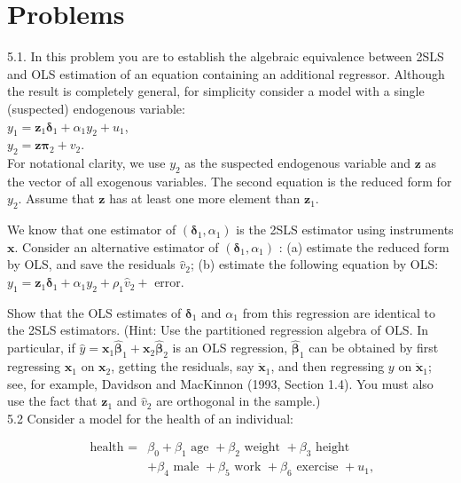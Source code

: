 \documentclass[10pt]{article}
\begin{document}
\section*{Problems}
5.1. In this problem you are to establish the algebraic equivalence between 2SLS and OLS estimation of an equation containing an additional regressor. Although the result is completely general, for simplicity consider a model with a single (suspected) endogenous variable:\\
$y_{1}=\mathbf{z}_{1} \boldsymbol{\delta}_{1}+\alpha_{1} y_{2}+u_{1}$,\\
$y_{2}=\mathbf{z} \boldsymbol{\pi}_{2}+v_{2}$.\\
For notational clarity, we use $y_{2}$ as the suspected endogenous variable and $\mathbf{z}$ as the vector of all exogenous variables. The second equation is the reduced form for $y_{2}$. Assume that $\mathbf{z}$ has at least one more element than $\mathbf{z}_{1}$.

We know that one estimator of $\left(\boldsymbol{\delta}_{1}, \alpha_{1}\right)$ is the 2SLS estimator using instruments $\mathbf{x}$. Consider an alternative estimator of $\left(\boldsymbol{\delta}_{1}, \alpha_{1}\right)$ : (a) estimate the reduced form by OLS, and save the residuals $\hat{v}_{2}$; (b) estimate the following equation by OLS:\\
$y_{1}=\mathbf{z}_{1} \boldsymbol{\delta}_{1}+\alpha_{1} y_{2}+\rho_{1} \hat{v}_{2}+$ error.

Show that the OLS estimates of $\boldsymbol{\delta}_{1}$ and $\alpha_{1}$ from this regression are identical to the 2SLS estimators. (Hint: Use the partitioned regression algebra of OLS. In particular, if $\hat{y}=\mathbf{x}_{1} \hat{\boldsymbol{\beta}}_{1}+\mathbf{x}_{2} \hat{\boldsymbol{\beta}}_{2}$ is an OLS regression, $\hat{\boldsymbol{\beta}}_{1}$ can be obtained by first regressing $\mathbf{x}_{1}$ on $\mathbf{x}_{2}$, getting the residuals, say $\ddot{\mathbf{x}}_{1}$, and then regressing $y$ on $\ddot{\mathbf{x}}_{1}$; see, for example, Davidson and MacKinnon (1993, Section 1.4). You must also use the fact that $\mathbf{z}_{1}$ and $\hat{v}_{2}$ are orthogonal in the sample.)\\
5.2 Consider a model for the health of an individual:


\begin{align*}
\text { health }= & \beta_{0}+\beta_{1} \text { age }+\beta_{2} \text { weight }+\beta_{3} \text { height } \\
& +\beta_{4} \text { male }+\beta_{5} \text { work }+\beta_{6} \text { exercise }+u_{1}, \tag{5.53}
\end{align*}
\end{document}
